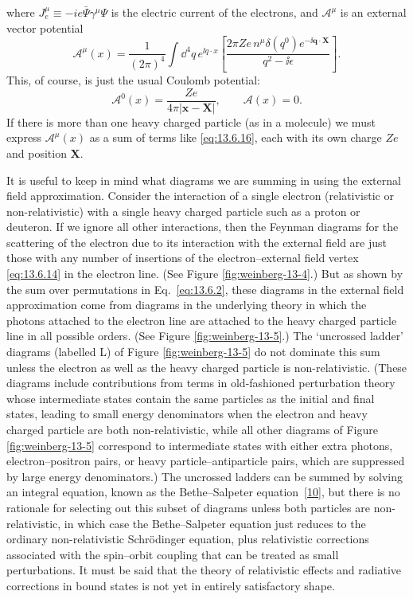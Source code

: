 where $J_e^\mu\equiv-ie\bar\Psi\gamma^\mu\Psi$ is the electric current of the electrons, and $\mathcal A^\mu$ is an
external vector potential
\begin{equation}
\mathcal A^\mu(x)=\frac{1}{(2\pi)^4}\int \dd^4q\,e^{\ii q\cdot x}
\left[\frac{2\pi Ze\,n^\mu\delta(q^0)e^{-\ii\mathbf q\cdot\mathbf X}}
{q^2-\ii\epsilon}\right].
\tag{13.6.15}\label{eq:13.6.15}
\end{equation}
This, of course, is just the usual Coulomb potential:
\begin{equation}
\mathcal A^0(x)=\frac{Ze}{4\pi|\mathbf x-\mathbf X|},
\qquad \boldsymbol{\mathcal A}(x)=0.
\tag{13.6.16}\label{eq:13.6.16}
\end{equation}
If there is more than one heavy charged particle (as in a molecule) we
must express $\mathcal A^\mu(x)$ as a sum of terms like \eqref{eq:13.6.16}, each with its own
charge $Ze$ and position $\mathbf X$.

It is useful to keep in mind what diagrams we are summing in using the
external field approximation. Consider the interaction of a single electron
(relativistic or non-relativistic) with a single heavy charged particle such
as a proton or deuteron. If we ignore all other interactions, then the
Feynman diagrams for the scattering of the electron due to its interaction
with the external field are just those with any number of insertions of
the electron--external field vertex \eqref{eq:13.6.14} in the electron line. (See Figure
\ref{fig:weinberg-13-4}.) But as shown by the sum over permutations in Eq.~\eqref{eq:13.6.2}, these
diagrams in the external field approximation come from diagrams in the
underlying theory in which the photons attached to the electron line are
attached to the heavy charged particle line in all possible orders. (See
Figure \ref{fig:weinberg-13-5}.) The `uncrossed ladder' diagrams (labelled L) of Figure
\ref{fig:weinberg-13-5} do not dominate this sum unless the electron as well as the heavy
charged particle is non-relativistic. (These diagrams include contributions
from terms in old-fashioned perturbation theory whose intermediate states
contain the same particles as the initial and final states, leading to small
energy denominators when the electron and heavy charged particle are
both non-relativistic, while all other diagrams of Figure \ref{fig:weinberg-13-5} correspond
to intermediate states with either extra photons, electron--positron pairs,
or heavy particle--antiparticle pairs, which are suppressed by large energy
denominators.) The uncrossed ladders can be summed by solving an
integral equation, known as the Bethe--Salpeter equation~\hyperref[ref:13.10]{[10]}, but there is no
rationale for selecting out this subset of diagrams unless both particles are
non-relativistic, in which case the Bethe--Salpeter equation just reduces
to the ordinary non-relativistic Schr\"odinger equation, plus relativistic
corrections associated with the spin--orbit coupling that can be treated as
small perturbations. It must be said that the theory of relativistic effects
and radiative corrections in bound states is not yet in entirely satisfactory
shape.

